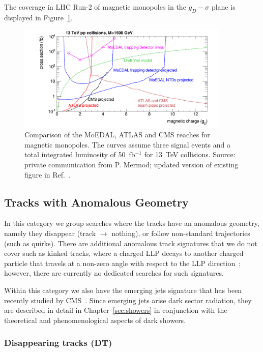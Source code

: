 {The coverage in LHC Run-2 of magnetic monopoles in the $g_D-\sigma$ plane is displayed in Figure~\ref{fig:magnetic_monopole_reach}.
%
\begin{figure}[htb]
\centering
\includegraphics[width=0.9\textwidth]{plots/monopoles_xsec_13TeV_3events}
\caption{Comparison of the MoEDAL, ATLAS and CMS reaches for magnetic monopoles. The curves assume three signal events and a total integrated luminosity of 50~fb$^{-1}$ for 13~TeV collisions. Source: private communication from P. Mermod; updated version of existing figure in Ref.~\cite{DeRoeck:2011aa}.}
\label{fig:magnetic_monopole_reach}
\end{figure}

\subsection{Tracks with Anomalous Geometry}

In this category we group searches where the tracks have an anomalous geometry, namely they disappear (track $\to$ nothing), or follow non-standard trajectories (such as quirks). There are additional anomalous track signatures that we do not cover such as kinked tracks, where a charged LLP decays to another charged particle that travels at a non-zero angle with respect to the LLP direction~\cite{Dimopoulos:1996vz,Hamaguchi:2004df,Asai:2011wy,Jung:2015boa}; however, there are currently no dedicated searches for such signatures. 

Within this category we also have the emerging jets signature that has been recently studied by CMS~\cite{CMS-PAS-EXO-18-001}. Since emerging jets arise dark sector radiation, they are described in detail in Chapter~\ref{sec:showers} in conjunction with the theoretical and phenomenological aspects of dark showers.

\subsubsection*{Disappearing tracks (DT)}

}
